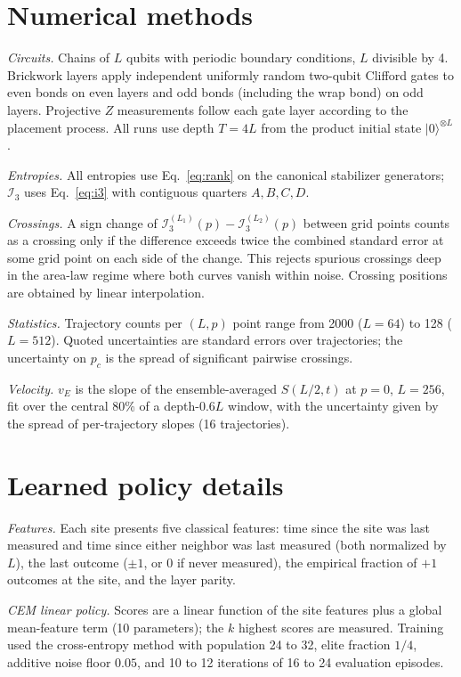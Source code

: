 \documentclass[aps,prb,twocolumn,superscriptaddress,nofootinbib]{revtex4-2}
\newcommand{\I}{\mathcal{I}}
\begin{document}
\appendix

\section{Numerical methods}
\label{app:numerics}

\emph{Circuits.} Chains of $L$ qubits with periodic boundary conditions,
$L$ divisible by 4. Brickwork layers apply independent uniformly random
two-qubit Clifford gates to even bonds on even layers and odd bonds
(including the wrap bond) on odd layers. Projective $Z$ measurements
follow each gate layer according to the placement process. All runs use
depth $T = 4L$ from the product initial state $|0\rangle^{\otimes L}$.

\emph{Entropies.} All entropies use Eq.~\eqref{eq:rank} on the canonical
stabilizer generators; $\I_3$ uses Eq.~\eqref{eq:i3} with contiguous
quarters $A, B, C, D$.

\emph{Crossings.} A sign change of
$\I_3^{(L_1)}(p) - \I_3^{(L_2)}(p)$ between grid points counts as a
crossing only if the difference exceeds twice the combined standard error
at some grid point on each side of the change. This rejects spurious
crossings deep in the area-law regime where both curves vanish within
noise. Crossing positions are obtained by linear interpolation.

\emph{Statistics.} Trajectory counts per $(L, p)$ point range from 2000
($L = 64$) to 128 ($L = 512$). Quoted uncertainties are standard errors
over trajectories; the uncertainty on $p_c$ is the spread of significant
pairwise crossings.

\emph{Velocity.} $v_E$ is the slope of the ensemble-averaged $S(L/2, t)$
at $p = 0$, $L = 256$, fit over the central 80\% of a depth-$0.6L$
window, with the uncertainty given by the spread of per-trajectory
slopes (16 trajectories).

\section{Learned policy details}
\label{app:learning}

\emph{Features.} Each site presents five classical features: time since
the site was last measured and time since either neighbor was last
measured (both normalized by $L$), the last outcome ($\pm 1$, or 0 if
never measured), the empirical fraction of $+1$ outcomes at the site, and
the layer parity.

\emph{CEM linear policy.} Scores are a linear function of the site
features plus a global mean-feature term (10 parameters); the $k$ highest
scores are measured. Training used the cross-entropy method with
population 24 to 32, elite fraction $1/4$, additive noise floor $0.05$,
and 10 to 12 iterations of 16 to 24 evaluation episodes.
\end{document}
